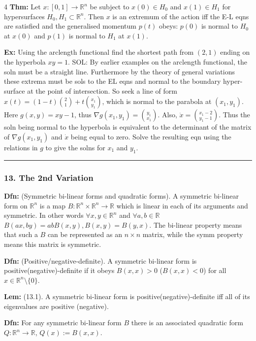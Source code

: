 \documentclass[landscape, 8pt]{extarticle}
\begin{document}
\begin{multicols*}{4}
		\textbf{Thm:} Let $x:[0,1]\to\mathbb{R}^n$ be subject to $x(0)\in H_0$ and $x(1)\in H_1$ for hypersurfaces $H_0,H_1\subset\mathbb{R}^n$. Then $x$ is an extremum of the action iff the E-L eqns are satisfied and the generalised momentum $p(t)$ obeys: $p(0)$ is normal to $H_0$ at $x(0)$ and $p(1)$ is normal to $H_1$ at $x(1)$.
		
		\textbf{Ex:} Using the arclength functional find the shortest path from $(2,1)$ ending on the hyperbola $xy=1$. SOL: By earlier examples on the arclength functional, the soln must be a straight line. Furthermore by the theory of general variations these extrema must be sols to the EL eqns and normal to the boundary hyper-surface at the point of intersection. So seek a line of form $x(t)=(1-t)\binom{2}{1}+t\binom{x_1}{y_1}$, which is normal to the parabola at $(x_1,y_1)$. Here $g(x,y)=xy-1$, thus $\nabla g(x_1,y_1)=\binom{y_1}{x_1}$. Also, $\dot{x}=\binom{x_1-2}{y_1-1}$. Thus the soln being normal to the hyperbola is equivalent to the determinant of the matrix of $\nabla g(x_1,y_1)$ and $\dot{x}$ being equal to zero. Solve the resulting eqn using the relations in $g$ to give the solns for $x_1$ and $y_1$.
		
		\hrule
		\vspace*{-3pt}
		\subsubsection*{\tiny{13. The 2nd Variation}}
		\vspace*{-5pt}
		
		\textbf{Dfn:} (Symmetric bi-linear forms and quadratic forms). A symmetric bi-linear form on $\mathbb{R}^n$ is a map $B:\mathbb{R}^n\times\mathbb{R}^n\to\mathbb{R}$ which is linear in each of its arguments and symmetric. In other words $\forall x,y\in\mathbb{R}^n$ and $\forall a,b\in\mathbb{R}$
		$
		B(ax,by)=abB(x,y), B(x,y)=B(y,x).
		$
		The bi-linear property means that such a $B$ can be represented as an $n\times n$ matrix, while the symm property means this matrix is symmetric.
		
		\textbf{Dfn:} (Positive/negative-definite). A symmetric bi-linear form is positive(negative)-definite if it obeys $B(x,x)>0$ ($B(x,x)<0$) for all $x\in\mathbb{R}^n\setminus\{0\}$.
		
		\textbf{Lem:} (13.1). A symmetric bi-linear form is positive(negative)-definite iff all of its eigenvalues are positive (negative).
		
		\textbf{Dfn:} For any symmetric bi-linear form $B$ there is an associated quadratic form $Q:\mathbb{R}^n\to\mathbb{R}$, $Q(x):=B(x,x)$.
		

\end{multicols*}
\end{document}
